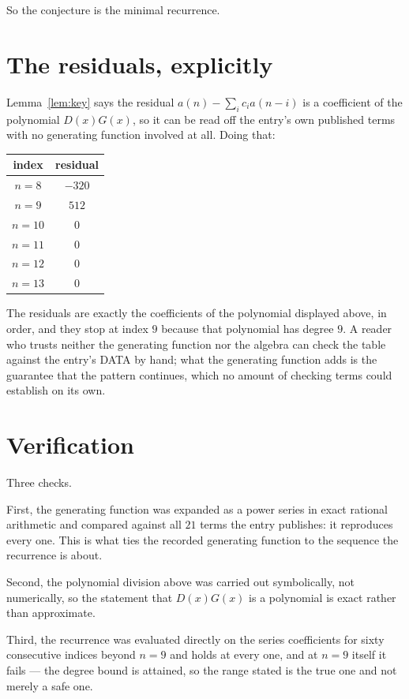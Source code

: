 \documentclass[11pt,a4paper]{article}
\theoremstyle{plain}
\theoremstyle{definition}
\begin{document}
So the conjecture is the minimal recurrence.

\section{The residuals, explicitly}

Lemma~\ref{lem:key} says the residual $a(n)-\sum_ic_ia(n-i)$ is a coefficient of the
polynomial $D(x)G(x)$, so it can be read off the entry's own published terms with no
generating function involved at all. Doing that:
\begin{center}
\begin{tabular}{cc}
index & residual \\ \hline
$n=8$ & $-320$ \\
$n=9$ & $512$ \\
$n=10$ & $0$ \\
$n=11$ & $0$ \\
$n=12$ & $0$ \\
$n=13$ & $0$
\end{tabular}
\end{center}
The residuals are exactly the coefficients of the polynomial displayed above, in order, and
they stop at index $9$ because that polynomial has degree $9$. A reader who trusts
neither the generating function nor the algebra can check the table against the entry's DATA
by hand; what the generating function adds is the guarantee that the pattern continues, which
no amount of checking terms could establish on its own.

\section{Verification}

Three checks.

First, the generating function was expanded as a power series in exact rational arithmetic and
compared against all $21$ terms the entry publishes: it reproduces every one. This is
what ties the recorded generating function to the sequence the recurrence is about.

Second, the polynomial division above was carried out symbolically, not numerically, so the
statement that $D(x)G(x)$ is a polynomial is exact rather than approximate.

Third, the recurrence was evaluated directly on the series coefficients for sixty consecutive
indices beyond $n=9$ and holds at every one, and at $n=9$ itself it fails --- the
degree bound is attained, so the range stated is the true one and not merely a safe one.
\end{document}
